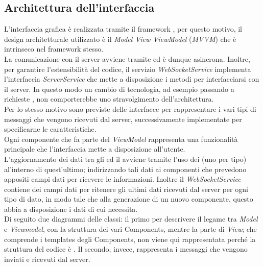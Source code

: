 \subsection{Architettura dell'interfaccia}
	L'interfaccia grafica è realizzata tramite il framework , per questo motivo, il design architetturale utilizzato è il \textit{Model View ViewModel} (\textit{MVVM}) che è intrinseco nel framework stesso. \\
	\newline
	La comunicazione con il server avviene tramite  ed è dunque asincrona. 
	Inoltre, per garantire l'estensibilità del codice, il servizio \textit{WebSocketService} implementa l'interfaccia \textit{ServerService} che mette a disposizione i metodi per interfacciarsi con il server. In questo modo un cambio di tecnologia, ad esempio passando a richieste , non comporterebbe uno stravolgimento dell'architettura. \\
	Per lo stesso motivo sono previste delle interfacce per rappresentare i vari tipi di messaggi che vengono ricevuti dal server, successivamente implementate per specificarne le caratteristiche. \\
	Ogni componente che fa parte del \textit{ViewModel} rappresenta una funzionalità principale che l'interfaccia mette a disposizione all'utente.\\
	\newline
	L'aggiornamento dei dati tra gli  ed il  avviene tramite l'uso dei  (uno per tipo) al'interno di quest'ultimo; indirizzando tali dati  ai componenti che prevedono appositi campi dati per ricevere le informazioni.
	Inoltre il \textit{WebSocketService} contiene dei campi dati per ritenere gli ultimi dati ricevuti dal server per ogni tipo di dato, in modo tale che alla generazione di un nuovo componente,  questo abbia a disposizione i dati di cui necessita. \\
	\newline
	Di seguito due diagrammi delle classi: il primo per descrivere il legame tra \textit{Model} e \textit{Viewmodel}, con la struttura dei vari  Components, mentre la parte di \textit{View}; che comprende i templates degli  Components, non viene qui rappresentata perché la struttura del codice è .
	Il secondo, invece, rappresenta i messaggi che vengono inviati e ricevuti dal server.
	\newpage
	
